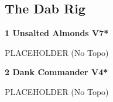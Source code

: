 \begin{multicols}{2}
\needspace{1.5cm}
\subsection*{The Dab Rig}\label{bf:The Dab Rig}
	


\needspace{1.5cm}
\label{rt:Unsalted Almonds}
\colorbox{Goldenrod!50}{
\parbox{0.95\linewidth}{
\textbf{
1 Unsalted Almonds V7*  
}}}

\begin{adjustwidth}{0.5cm}{}			
PLACEHOLDER (No Topo)
\end{adjustwidth}



\needspace{1.5cm}
\label{rt:Dank Commander}
\colorbox{RoyalBlue!20}{
\parbox{0.95\linewidth}{
\textbf{
2 Dank Commander V4*  
}}}

\begin{adjustwidth}{0.5cm}{}			
PLACEHOLDER (No Topo)
\end{adjustwidth}





\end{multicols}
\clearpage